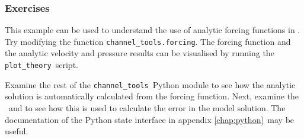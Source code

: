 \subsubsection{Exercises}

This example can be used to understand the use of analytic forcing
functions in \fluidity. Try modifying the function
\lstinline[language=python]{channel_tools.forcing}. The forcing function
and the analytic velocity and pressure results can be visualised by running
the \lstinline[language=python]{plot_theory}\ script.

Examine the rest of the \lstinline[language=python]{channel_tools}\ Python
module to see how the analytic solution is automatically calculated from the
forcing function. Next, examine the \
and  to see how this is used to
calculate the error in the model solution. The documentation of the Python
state interface in appendix \ref{chap:python}\ may be useful.


